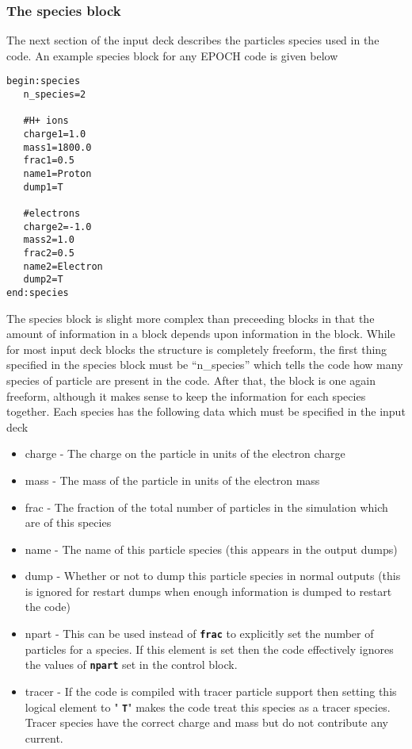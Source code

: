 \documentclass[12pt]{article}
\newcommand{\simpleboxverbatim}{\begin{Verbatim}[obeytabs=true,frame=single,
  framerule=0.5mm,rulecolor=\color{warwickmid}]}
\newcommand{\inlinecode}[1]{{\color{warwickred} \bf\texttt{#1}}}
\newcommand{\nEPOCH}{{\color{warwickdark}\fontfamily{phv}\selectfont EPOCH}}
\newcommand{\EPOCH}{{\nEPOCH} }
\begin{document}
\subsubsection{The species block}
The next section of the input deck describes the particles species used in the
code. An example species block for any \EPOCH code is given below\\
\simpleboxverbatim
begin:species
   n_species=2

   #H+ ions
   charge1=1.0
   mass1=1800.0
   frac1=0.5
   name1=Proton
   dump1=T

   #electrons
   charge2=-1.0
   mass2=1.0
   frac2=0.5
   name2=Electron
   dump2=T
end:species
\end{Verbatim}

The species block is slight more complex than preceeding blocks in that the
amount of information in a block depends upon information in the block. While
for most input deck blocks the structure is completely freeform, the first
thing specified in the species block must be ``n\_species'' which tells the
code how many species of particle are present in the code. After that, the
block is one again freeform, although it makes sense to keep the information
for each species together. Each species has the following data which must be
specified in the input deck\\
\begin{itemize}
\item charge - The charge on the particle in units of the electron charge
\item mass - The mass of the particle in units of the electron mass
\item frac - The fraction of the total number of particles in the simulation
  which are of this species
\item name - The name of this particle species (this appears in the output
  dumps)
\item dump - Whether or not to dump this particle species in normal outputs
  (this is ignored for restart dumps when enough information is dumped to
  restart the code)
\item npart - This can be used instead of \inlinecode{frac} to explicitly set
  the number of particles for a species. If this element is set then the code
  effectively ignores the values of \inlinecode{npart} set in the control
  block.
\item tracer - If the code is compiled with tracer particle support then
  setting this logical element to "\inlinecode{T}" makes the code treat this
  species as a tracer species. Tracer species have the correct charge and mass
  but do not contribute any current.
\end{itemize}
\end{document}
